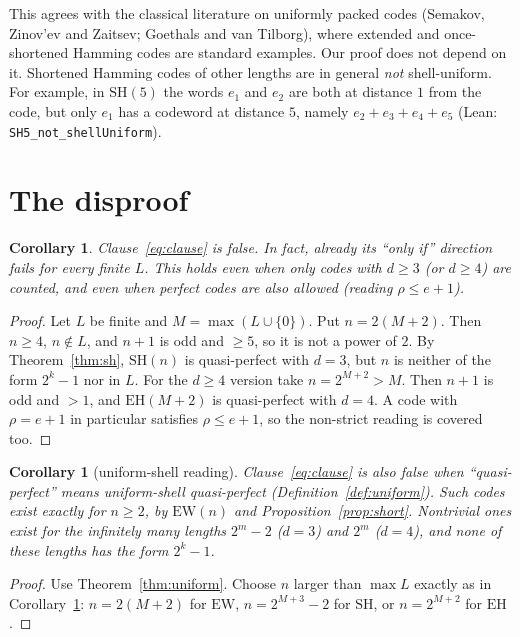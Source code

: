 \documentclass[11pt]{article}
\newtheorem{corollary}[theorem]{Corollary}
\theoremstyle{definition}
\theoremstyle{remark}
\begin{document}
This agrees with the classical literature on uniformly packed codes
(Semakov, Zinov'ev and Zaitsev; Goethals and van Tilborg), where extended and
once-shortened Hamming codes are standard examples. Our proof does not depend
on it. Shortened Hamming codes of other lengths are in general \emph{not}
shell-uniform. For example, in $\mathrm{SH}(5)$ the words $e_1$ and $e_2$ are
both at distance $1$ from the code, but only $e_1$ has a codeword at distance
$5$, namely $e_2+e_3+e_4+e_5$ (Lean: \texttt{SH5\_not\_shellUniform}).

\section{The disproof}
\begin{corollary}\label{cor:main}
Clause~\eqref{eq:clause} is false. In fact, already its ``only if'' direction
fails for every finite $L$. This holds even when only codes with $d\ge 3$ (or
$d\ge 4$) are counted, and even when perfect codes are also allowed (reading
$\rho\le e+1$).
\end{corollary}
\begin{proof}
Let $L$ be finite and $M=\max(L\cup\{0\})$. Put $n=2(M+2)$. Then $n\ge 4$,
$n\notin L$, and $n+1$ is odd and $\ge 5$, so it is not a power of $2$. By
Theorem~\ref{thm:sh}, $\mathrm{SH}(n)$ is quasi-perfect with $d=3$, but $n$ is
neither of the form $2^k-1$ nor in $L$. For the $d\ge 4$ version take
$n=2^{M+2}>M$. Then $n+1$ is odd and $>1$, and $\mathrm{EH}(M+2)$ is
quasi-perfect with $d=4$. A code with $\rho=e+1$ in particular satisfies
$\rho\le e+1$, so the non-strict reading is covered too.
\end{proof}

\begin{corollary}[uniform-shell reading]\label{cor:uniform}
Clause~\eqref{eq:clause} is also false when ``quasi-perfect'' means
uniform-shell quasi-perfect (Definition~\ref{def:uniform}). Such codes exist
exactly for $n\ge 2$, by $\mathrm{EW}(n)$ and Proposition~\ref{prop:short}.
Nontrivial ones exist for the infinitely many lengths $2^m-2$ ($d=3$) and $2^m$
($d=4$), and none of these lengths has the form $2^k-1$.
\end{corollary}
\begin{proof}
Use Theorem~\ref{thm:uniform}. Choose $n$ larger than $\max L$ exactly as in
Corollary~\ref{cor:main}: $n=2(M+2)$ for $\mathrm{EW}$, $n=2^{M+3}-2$ for
$\mathrm{SH}$, or $n=2^{M+2}$ for $\mathrm{EH}$.
\end{proof}
\end{document}
